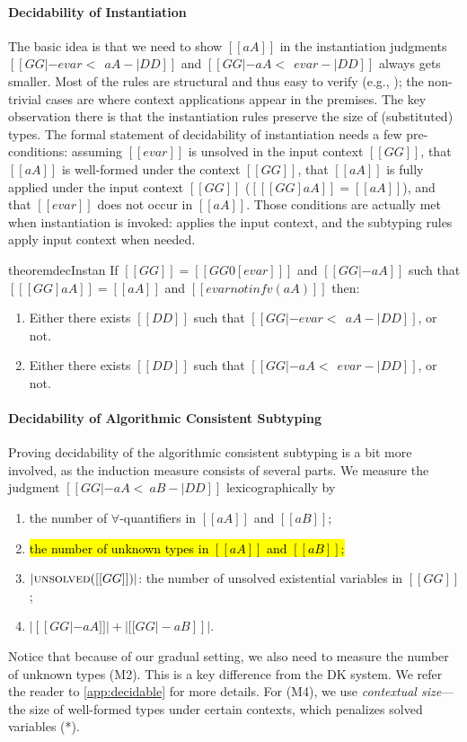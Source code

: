 \paragraph{Decidability of Instantiation}

The basic idea is that we need to show $[[aA]]$ in the instantiation judgments
$[[GG |- evar <~~ aA -| DD ]]$ and $[[GG |- aA <~~ evar -| DD]]$ always gets
smaller. Most of the rules are structural and thus easy to verify (e.g.,
); the non-trivial cases are 
where context applications appear in the premises. The key observation there
is that the instantiation rules preserve the size of (substituted) types.
The formal statement of decidability of instantiation needs a few
pre-conditions: assuming $[[evar]]$ is unsolved in the input context
$[[GG]]$, that $[[aA]]$ is well-formed under the context $[[GG]]$, that $[[aA]]$
is fully applied under the input context $[[GG]]$ ($[[ [GG]aA ]] = [[aA]]$), and
that $[[evar]]$ does not occur in $[[aA]]$. Those conditions are actually met
when instantiation is invoked:  applies the input context, and the
subtyping rules apply input context when needed.

\begin{restatable}{theorem}{decInstan}
  If $[[GG]]  = [[ GG0[evar]  ]]  $ and $[[  GG |- aA  ]]$ such that $[[ [GG]aA  ]] = [[aA]]$ and $[[ evar notin fv(aA)   ]]$ then:
  \begin{enumerate}
  \item Either there exists $[[DD]]$ such that $[[GG |- evar <~~ aA -| DD]]$, or not.
  \item Either there exists $[[DD]]$ such that $[[GG |- aA <~~ evar -| DD]]$, or not.
  \end{enumerate}
\end{restatable}


\paragraph{Decidability of Algorithmic Consistent Subtyping}

Proving decidability of the algorithmic consistent subtyping is a bit more
involved, as the induction measure consists of several parts.
We measure the judgment $[[GG |- aA <~ aB -| DD]]$ lexicographically by
\begin{enumerate}[(M1)]
\item the number of $\forall$-quantifiers in $[[aA]]$ and $[[aB]]$;
\item \hl{the number of unknown types in $[[aA]]$ and $[[aB]]$;}
\item $| \textsc{unsolved}([[GG]]) |$: the number of unsolved existential
  variables in $[[GG]]$;
\item $| [[GG |- aA]] | + | [[GG |- aB]]   |$.
\end{enumerate}
Notice that because of our gradual setting, we also need to measure the number
of unknown types (M2). This is a key difference from the DK system.
We refer the reader to \cref{app:decidable} for more details.
For (M4), we
use \emph{contextual size}---the size of well-formed types under certain
contexts, which penalizes solved variables (*).

